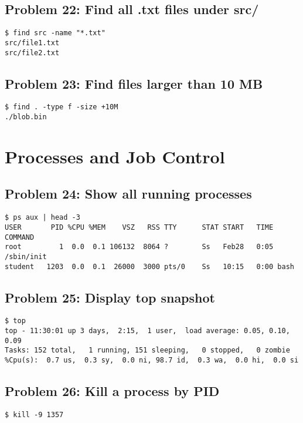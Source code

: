 \subsection*{Problem 22: Find all .txt files under src/}
\begin{verbatim}
$ find src -name "*.txt"
src/file1.txt
src/file2.txt
\end{verbatim}

\subsection*{Problem 23: Find files larger than 10 MB}
\begin{verbatim}
$ find . -type f -size +10M
./blob.bin
\end{verbatim}

\section{Processes and Job Control}

\subsection*{Problem 24: Show all running processes}
\begin{verbatim}
$ ps aux | head -3
USER       PID %CPU %MEM    VSZ   RSS TTY      STAT START   TIME COMMAND
root         1  0.0  0.1 106132  8064 ?        Ss   Feb28   0:05 /sbin/init
student   1203  0.0  0.1  26000  3000 pts/0    Ss   10:15   0:00 bash
\end{verbatim}

\subsection*{Problem 25: Display top snapshot}
\begin{verbatim}
$ top
top - 11:30:01 up 3 days,  2:15,  1 user,  load average: 0.05, 0.10, 0.09
Tasks: 152 total,   1 running, 151 sleeping,   0 stopped,   0 zombie
%Cpu(s):  0.7 us,  0.3 sy,  0.0 ni, 98.7 id,  0.3 wa,  0.0 hi,  0.0 si
\end{verbatim}

\subsection*{Problem 26: Kill a process by PID}
\begin{verbatim}
$ kill -9 1357
\end{verbatim}

